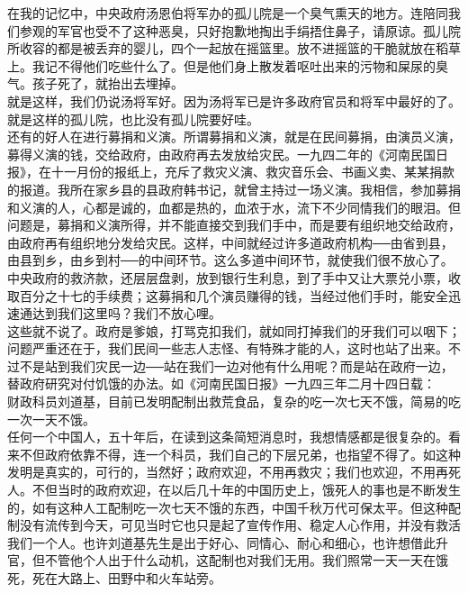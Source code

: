 在我的记忆中，中央政府汤恩伯将军办的孤儿院是一个臭气熏天的地方。连陪同我们参观的军官也受不了这种恶臭，只好抱歉地掏出手绢捂住鼻子，请原谅。孤儿院所收容的都是被丢弃的婴儿，四个一起放在摇篮里。放不进摇篮的干脆就放在稻草上。我记不得他们吃些什么了。但是他们身上散发着呕吐出来的污物和屎尿的臭气。孩子死了，就抬出去埋掉。\\

就是这样，我们仍说汤将军好。因为汤将军已是许多政府官员和将军中最好的了。就是这样的孤儿院，也比没有孤儿院要好哇。\\

还有的好人在进行募捐和义演。所谓募捐和义演，就是在民间募捐，由演员义演，募得义演的钱，交给政府，由政府再去发放给灾民。一九四二年的《河南民国日报》，在十一月份的报纸上，充斥了救灾义演、救灾音乐会、书画义卖、某某捐款的报道。我所在家乡县的县政府韩书记，就曾主持过一场义演。我相信，参加募捐和义演的人，心都是诚的，血都是热的，血浓于水，流下不少同情我们的眼泪。但问题是，募捐和义演所得，并不能直接交到我们手中，而是要有组织地交给政府，由政府再有组织地分发给灾民。这样，中间就经过许多道政府机构──由省到县，由县到乡，由乡到村──的中间环节。这么多道中间环节，就使我们很不放心了。中央政府的救济款，还层层盘剥，放到银行生利息，到了手中又让大票兑小票，收取百分之十七的手续费；这募捐和几个演员赚得的钱，当经过他们手时，能安全迅速通达到我们这里吗？我们不放心哩。\\

这些就不说了。政府是爹娘，打骂克扣我们，就如同打掉我们的牙我们可以咽下；问题严重还在于，我们民间一些志人志怪、有特殊才能的人，这时也站了出来。不过不是站到我们灾民一边──站在我们一边对他有什么用呢？而是站在政府一边，替政府研究对付饥饿的办法。如《河南民国日报》一九四三年二月十四日载：\\

财政科员刘道基，目前已发明配制出救荒食品，复杂的吃一次七天不饿，简易的吃一次一天不饿。\\

任何一个中国人，五十年后，在读到这条简短消息时，我想情感都是很复杂的。看来不但政府依靠不得，连一个科员，我们自己的下层兄弟，也指望不得了。如这种发明是真实的，可行的，当然好；政府欢迎，不用再救灾；我们也欢迎，不用再死人。不但当时的政府欢迎，在以后几十年的中国历史上，饿死人的事也是不断发生的，如有这种人工配制吃一次七天不饿的东西，中国千秋万代可保太平。但这种配制没有流传到今天，可见当时它也只是起了宣传作用、稳定人心作用，并没有救活我们一个人。也许刘道基先生是出于好心、同情心、耐心和细心，也许想借此升官，但不管他个人出于什么动机，这配制也对我们无用。我们照常一天一天在饿死，死在大路上、田野中和火车站旁。\\

